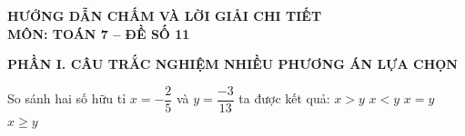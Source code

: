 \documentclass[12pt,a4paper]{article}
\begin{document}
\begin{center}
\textbf{\Large HƯỚNG DẪN CHẤM VÀ LỜI GIẢI CHI TIẾT}\\
\vspace{1mm}
\textbf{\large MÔN: TOÁN 7 -- ĐỀ SỐ 11}
\end{center}
\vspace{2mm}

\noindent\textbf{\large PHẦN I. CÂU TRẮC NGHIỆM NHIỀU PHƯƠNG ÁN LỰA CHỌN}

\vspace{1mm}
\begin{ex}
So sánh hai số hữu tỉ $x = -\dfrac{2}{5}$ và $y = \dfrac{-3}{13}$ ta được kết quả:
\choice
{$x > y$}
{\True $x < y$}
{$x = y$}
{$x \ge y$}
\end{ex}
\end{document}
